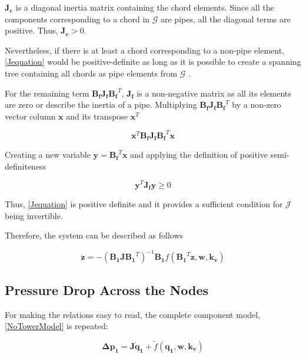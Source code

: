 $\pmb{J_c}$ is a diagonal inertia matrix containing the chord elements. Since all the components corresponding to a chord in $\pmb{\mathcal{G}}$ are pipes, all the 
diagonal terms are positive. Thus, $\pmb{J_c} > 0$. 

Nevertheless, if there is at least a chord corresponding to a non-pipe element, \eqref{Jequation} 
would be positive-definite as long as it is possible to create a spanning tree containing all chords as pipe elements from $\pmb{\mathcal{G}}$ \cite{TowerModel}.

For the remaining term $\pmb{B_f J_f {B_f}}^T$, $\pmb{J_f}$ is a non-negative matrix as all its elements are zero or describe the inertia of a pipe. 
Multiplying $\pmb{B_f J_f {B_f}}^T$ by a non-zero vector column $\mathbf{x}$ and its transpose $\mathbf{x}^{T}$

\begin{equation}
  \pmb{x}^{T} \pmb{B_f J_f {B_f}}^T \pmb{x}
  \label{PosDefi}
\end{equation}

Creating a new variable $\pmb{y} = \pmb{B_f}^T \mathbf{x}$ and applying the definition of positive semi-definiteness 
\cite{MatrixBook}

\begin{equation}
  \pmb{y}^{T} \pmb{J_f y} \geqslant 0
  \label{PosDefEq}
\end{equation}

Thus, \eqref{Jequation} is positive definite and it provides a sufficient condition for $\pmb{\mathcal{J}}$ being invertible. 

Therefore, the system can be described as follows

\begin{equation}
   \pmb{\dot{z}}  = - (\pmb{B_1 J {B_1}}^T)^{-1}\pmb{B_1} f({\pmb{B_1}}^T \pmb{z},\pmb{ w}, \pmb{k_v})
   \label{ParatModelFinal}
 \end{equation}

\subsection{Pressure Drop Across the Nodes}
\label{ModelRelationSection}

For making the relations easy to read, the complete component model, \eqref{NoTowerModel} is repeated: 

\begin{equation}
  \pmb{\Delta p_1} =  \pmb{J} \pmb{\dot{q}_1} + \tilde{f}(\pmb{q_1}, \pmb{w}, \pmb{k_v})
  \label{RecallModel}
\end{equation}

